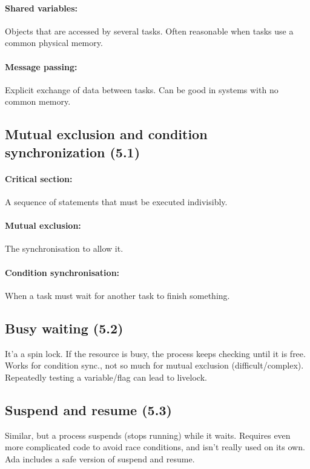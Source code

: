 \documentclass[a4paper, 12pt]{article}
\begin{document}
\paragraph{Shared variables:} Objects that are accessed by several tasks. Often reasonable when tasks use a common physical memory.
\paragraph{Message passing:} Explicit exchange of data between tasks. Can be good in systems with no common memory.

\subsection{Mutual exclusion and condition synchronization (5.1)}
\paragraph{Critical section:} A sequence of statements that must be executed indivisibly.
\paragraph{Mutual exclusion:} The synchronisation to allow it.
\paragraph{Condition synchronisation:} When a task must wait for another task to finish something.

\subsection{Busy waiting (5.2)}
It'a a spin lock. If the resource is busy, the process keeps checking until it is free. Works for condition sync., not so much for mutual exclusion (difficult/complex). Repeatedly testing a variable/flag can lead to livelock. 

\subsection{Suspend and resume (5.3)}
Similar, but a process suspends (stops running) while it waits. Requires even more complicated code to avoid race conditions, and isn't really used on its own. Ada includes a safe version of suspend and resume.
\end{document}
